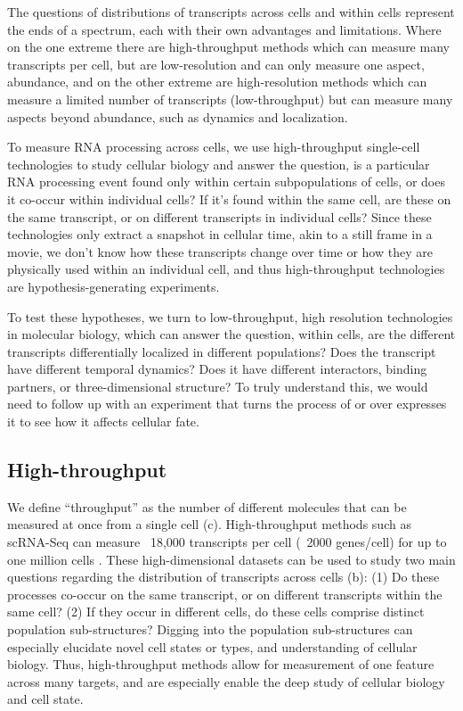 The questions of distributions of transcripts across cells and within cells represent the ends of a spectrum, each with their own advantages and limitations. Where on the one extreme there are high-throughput methods which can measure many transcripts per cell, but are low-resolution and can only measure one aspect, abundance, and on the other extreme are high-resolution methods which can measure a limited number of transcripts (low-throughput) but can measure many aspects beyond abundance, such as dynamics and localization.

To measure RNA processing across cells, we use high-throughput single-cell technologies to study cellular biology and answer the question, is a particular RNA processing event found only within certain subpopulations of cells, or does it co-occur within individual cells? If it's found within the same cell, are these on the same transcript, or on different transcripts in individual cells? Since these technologies only extract a snapshot in cellular time, akin to a still frame in a movie, we don't know how these transcripts change over time or how they are physically used within an individual cell, and thus high-throughput technologies are hypothesis-generating experiments. 

To test these hypotheses, we turn to low-throughput, high resolution technologies in molecular biology, which can answer the question, within cells, are the different transcripts differentially localized in different populations? Does the transcript have different temporal dynamics? Does it have different interactors, binding partners, or three-dimensional structure? To truly understand this, we would need to follow up with an experiment that turns the process of or over expresses it to see how it affects cellular fate.

\subsection{High-throughput}
We define ``throughput'' as the number of different molecules that can be measured at once from a single cell (c). High-throughput methods such as scRNA-Seq can measure ~18,000 transcripts per cell (~2000 genes/cell) for up to one million cells  \cite{noauthor_undated-xt}. These high-dimensional datasets can be used to study two main questions regarding the distribution of transcripts across cells  (b): (1) Do these processes co-occur on the same transcript, or on different transcripts within the same cell? (2) If they occur in different cells, do these cells comprise distinct population sub-structures? Digging into the population sub-structures can especially elucidate novel cell states or types, and understanding of cellular biology. Thus, high-throughput methods allow for measurement of one feature across many targets, and are especially enable the deep study of cellular biology and cell state.

